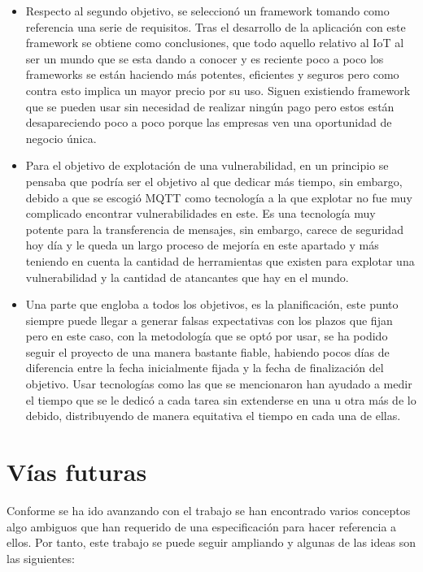 \begin{itemize}
    \item Respecto al segundo objetivo, se seleccionó un framework tomando como referencia una serie de requisitos. Tras el desarrollo de la aplicación con este framework se obtiene como conclusiones, que todo aquello relativo al IoT al ser un mundo que se esta dando a conocer y es reciente poco a poco los frameworks se están haciendo más potentes, eficientes y seguros pero como contra esto implica un mayor precio por su uso. Siguen existiendo framework que se pueden usar sin necesidad de realizar ningún pago pero estos están desapareciendo poco a poco porque las empresas ven una oportunidad de negocio única.
    \item Para el objetivo de explotación de una vulnerabilidad, en un principio se pensaba que podría ser el objetivo al que dedicar más tiempo, sin embargo, debido a que se escogió MQTT como tecnología a la que explotar no fue muy complicado encontrar vulnerabilidades en este. Es una tecnología muy potente para la transferencia de mensajes, sin embargo, carece de seguridad hoy día y le queda un largo proceso de mejoría en este apartado y más teniendo en cuenta la cantidad de herramientas que existen para explotar una vulnerabilidad y la cantidad de atancantes que hay en el mundo.
    \item Una parte que engloba a todos los objetivos, es la planificación, este punto siempre puede llegar a generar falsas expectativas con los plazos que fijan pero en este caso, con la metodología que se optó por usar, se ha podido seguir el proyecto de una manera bastante fiable, habiendo pocos días de diferencia entre la fecha inicialmente fijada y la fecha de finalización del objetivo. Usar tecnologías como las que se mencionaron han ayudado a medir el tiempo que se le dedicó a cada tarea sin extenderse en una u otra más de lo debido, distribuyendo de manera equitativa el tiempo en cada una de ellas.
\end{itemize}

\section{Vías futuras}

Conforme se ha ido avanzando con el trabajo se han encontrado varios conceptos algo ambiguos que han requerido de una especificación para hacer referencia a ellos. Por tanto, este trabajo se puede seguir ampliando y algunas de las ideas son las siguientes:

